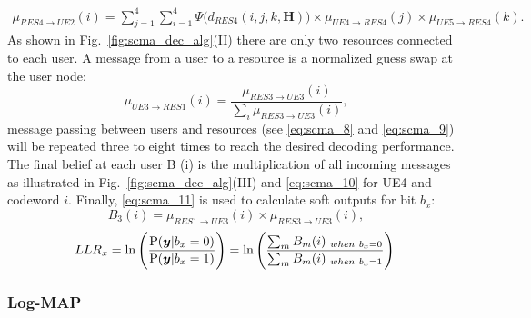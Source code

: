 \begin{equation}
  \label{eq:scma_8}
  \begin{split}
  \mu_{RES4 \rightarrow UE2}(i) = \sum\limits_{j=1}^4 \sum\limits_{i=1}^4 \Psi
  \Big(d_{RES4}(i,j,k,\bm{H}) \Big)
  \times \mu_{UE4 \rightarrow RES4}(j) \times \mu_{UE5 \rightarrow RES4}(k).
  \end{split}
\end{equation}
As shown in Fig.~\ref{fig:scma_dec_alg}(II) there are only two resources
connected to each user. A message from a user to a resource is a normalized
guess swap at the user node:
\begin{equation}
  \label{eq:scma_9}
  \mu_{UE3 \rightarrow RES1}(i) = \frac{\mu_{RES3 \rightarrow UE3}(i)}
  {\sum_i\mu_{RES3 \rightarrow UE3}(i)},
\end{equation}
message passing between users and resources (see \eqref{eq:scma_8} and
\eqref{eq:scma_9}) will be repeated three to eight times to reach the desired
decoding performance. The final belief at each user B (i) is the multiplication
of all incoming messages as illustrated in Fig.~{\ref{fig:scma_dec_alg}}(III)
and \eqref{eq:scma_10} for UE4 and codeword $i$. Finally, \eqref{eq:scma_11} is
used to calculate soft outputs for bit $b_x$:
\begin{equation}
  \label{eq:scma_10}
  B_3(i) = \mu_{RES1 \rightarrow UE3}(i) \times \mu_{RES3 \rightarrow UE3}(i),
\end{equation}
\begin{equation}
  \label{eq:scma_11}
  LLR_x = \ln \Bigg( \frac{\operatorname{P}(\bm{y}|b_x=0)}{\operatorname{P}(\bm{y}|b_x=1)} \Bigg) =
  \ln \Bigg( \frac{\sum_m B_m(i)_{~when~b_x=0}}{\sum_m B_m(i)_{~when~b_x=1}}
  \Bigg).
\end{equation}

\subsubsection{Log-MAP}
\label{sec:scma_log-map}

